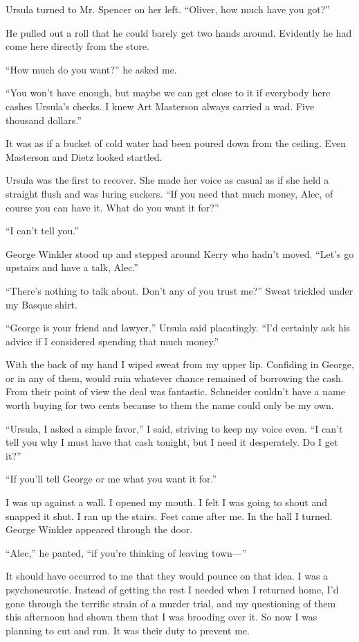 \documentclass{novel}
\begin{document}
Ursula turned to Mr. Spencer on her left. “Oliver, how much have you got?”

He pulled out a roll that he could barely get two hands around. Evidently he had come here directly from the store. 

“How much do you want?” he asked me.

“You won’t have enough, but maybe we can get close to it if everybody here cashes Ursula’s checks. I knew Art Masterson always carried a wad. Five thousand dollars.”

It was as if a bucket of cold water had been poured down from the ceiling. Even Masterson and Dietz looked startled.

Ursula was the first to recover. She made her voice as casual as if she held a straight flush and was luring suckers. “If you need that much money, Alec, of course you can have it. What do you want it for?”

“I can’t tell you.”

George Winkler stood up and stepped around Kerry who hadn’t moved. “Let’s go upstairs and have a talk, Alec.”

“There’s nothing to talk about. Don’t any of you trust me?” Sweat trickled under my Basque shirt.

“George is your friend and lawyer,” Ursula said placatingly. “I’d certainly ask his advice if I considered spending that much money.”

With the back of my hand I wiped sweat from my upper lip. Confiding in George, or in any of them, would ruin whatever chance remained of borrowing the cash. From their point of view the deal was fantastic. Schneider couldn’t have a name worth buying for two cents because to them the name could only be my own.

“Ursula, I asked a simple favor,” I said, striving to keep my voice even. “I can’t tell you why I must have that cash tonight, but I need it desperately. Do I get it?”

“If you’ll tell George or me what you want it for.”

I was up against a wall. I opened my mouth. I felt I was going to shout and snapped it shut. I ran up the stairs. Feet came after me. In the hall I turned. George Winkler appeared through the door.

“Alec,” he panted, “if you’re thinking of leaving town—”

\scenestars

It should have occurred to me that they would pounce on that idea. I was a psychoneurotic. Instead of getting the rest I needed when I returned home, I’d gone through the terrific strain of a murder trial, and my questioning of them this afternoon had shown them that I was brooding over it. So now I was planning to cut and run. It was their duty to prevent me.
\end{document}
